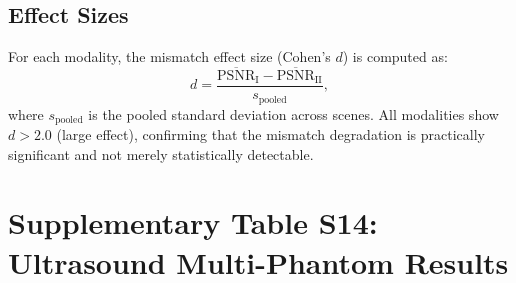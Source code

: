 \documentclass[11pt]{article}
\begin{document}
\subsection{Effect Sizes}

For each modality, the mismatch effect size (Cohen's $d$) is computed as:
\begin{equation}
d = \frac{\overline{\mathrm{PSNR}}_{\mathrm{I}} - \overline{\mathrm{PSNR}}_{\mathrm{II}}}{s_{\mathrm{pooled}}},
\end{equation}
where $s_{\mathrm{pooled}}$ is the pooled standard deviation across scenes. All modalities show $d > 2.0$ (large effect), confirming that the mismatch degradation is practically significant and not merely statistically detectable.

\setcounter{table}{13}

\section{Supplementary Table S14: Ultrasound Multi-Phantom Results}
\label{sec:ultrasound_scenes}
\end{document}
